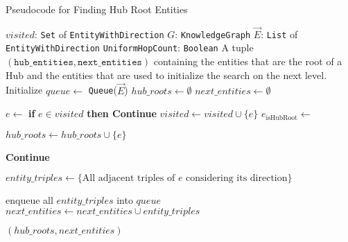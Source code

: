 \begin{algorithm}
\caption{Pseudocode for Finding Hub Root Entities}
\label{alg:finding_hub_roots}
\begin{algorithmic}[1]
\PersistentState
    \Statex $visited$: \texttt{Set} of \texttt{EntityWithDirection} 
    \Statex $G$: \texttt{KnowledgeGraph} 
\Require 
    \Statex $\vec{E}$: \texttt{List} of \texttt{EntityWithDirection} 
    \Statex \texttt{UniformHopCount}: \texttt{Boolean} 
\Ensure
    \Statex A tuple $(\texttt{hub\_entities}, \texttt{next\_entities})$ containing the entities that are the root of a Hub and the entities that are used to initialize the search on the next level.
\Statex
{} 
    \State Initialize $queue \gets$ \texttt{Queue}($\vec{E}$)
    \State $hub\_roots \gets \emptyset$ 
    \State $next\_entities \gets \emptyset$ 
    
        \State $e \gets$  
        \State \textbf{if} $e \in visited$ \textbf{then Continue}
        \State $visited \gets visited \cup \{e\}$ 
        \State $e_{\text{isHubRoot}} \gets$  
        
            \State $hub\_roots \gets hub\_roots \cup \{e\}$
        \EndIf
        
            \State \textbf{Continue} 
        \EndIf
        
        \State $entity\_triples \gets \{\text{All adjacent triples of } e \text{ considering its direction}\}$
        
            \State enqueue all $entity\_triples$ into $queue$
        \Else
            \State $next\_entities \gets next\_entities \cup entity\_triples$
        \EndIf
    \EndWhile
    
    \State \Return $(hub\_roots, next\_entities)$
\EndFunction

\end{algorithmic}
\end{algorithm}

